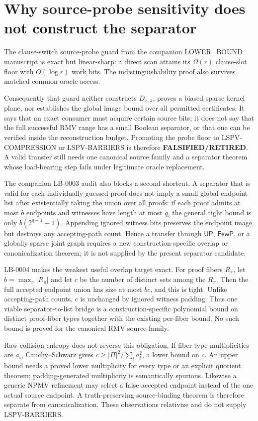 \documentclass[11pt]{article}
\begin{document}
\section{Why source-probe sensitivity does not construct the separator}
The clause-switch source-probe guard from the companion LOWER\_BOUND
manuscript is exact but linear-sharp: a direct scan attains its
\(\Omega(r)\) clause-slot floor with \(O(\log r)\) work bits.  The
indistinguishability proof also survives matched common-oracle access.

Consequently that guard neither constructs \(D_{x,\pi}\), proves a
biased sparse kernel plane, nor establishes the global image bound over
all permitted certificates.  It says that an exact consumer must acquire
certain source bits; it does not say that the full successful RMV range
has a small Boolean separator, or that one can be verified inside the
reconstruction budget.  Promoting the probe floor to LSPV-COMPRESSION or
LSPV-BARRIERS is therefore \textbf{FALSIFIED/RETIRED}.  A valid transfer
still needs one canonical source family and a separator theorem whose
load-bearing step fails under legitimate oracle replacement.

The companion LB-0003 audit also blocks a second shortcut. A separator
that is valid for each individually guessed proof does not imply a small
global endpoint list after existentially taking the union over all
proofs: if each proof admits at most \(b\) endpoints and witnesses have
length at most \(q\), the general tight bound is only
\(b(2^{q+1}-1)\). Appending ignored witness bits preserves the endpoint
image but destroys any accepting-path count. Hence a transfer through
\(\mathsf{UP}\), \(\mathsf{FewP}\), or a globally sparse joint graph
requires a new construction-specific overlap or canonicalization
theorem; it is not supplied by the present separator candidate.

LB-0004 makes the weakest useful overlap target exact.  For proof fibers
$R_\pi$, let $b=\max_\pi|R_\pi|$ and let $c$ be the number of distinct
sets among the $R_\pi$.  Then the full accepted endpoint union has size at
most $bc$, and this is tight.  Unlike accepting-path counts, $c$ is
unchanged by ignored witness padding.  Thus one viable separator-to-list
bridge is a construction-specific polynomial bound on distinct proof-fiber
types together with the existing per-fiber bound.  No such bound is proved
for the canonical RMV source family.

Raw collision entropy does not reverse this obligation.  If fiber-type
multiplicities are $a_i$, Cauchy--Schwarz gives
$c\ge |\Pi|^2/\sum_i a_i^2$, a lower bound on $c$.  An upper bound needs a
proved lower multiplicity for every type or an explicit quotient theorem;
padding-generated multiplicity is semantically spurious.  Likewise a
generic NPMV refinement may select a false accepted endpoint instead of the
one actual source endpoint.  A truth-preserving source-binding theorem is
therefore separate from canonicalization.  These observations relativize
and do not supply LSPV-BARRIERS.
\end{document}
